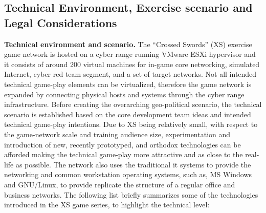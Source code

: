 \subsection{Technical Environment, Exercise scenario and Legal Considerations}
\label{sec:scenario}
\textbf{Technical environment and scenario.}
The ``Crossed Swords'' (XS) exercise game network is hosted on a cyber range running VMware ESXi hypervisor and it consists of around 200 virtual machines for in-game core networking, simulated Internet, cyber red team segment, and a set of target networks. Not all intended technical game-play elements can be virtualized, therefore the game network is expanded by connecting physical hosts and systems through the cyber range infrastructure. Before creating the overarching geo-political scenario, the technical scenario is established based on the core development team ideas and intended technical game-play intentions.
Due to XS being relatively small, with respect to the game-network scale and training audience size, experimentation and introduction of new, recently prototyped, and orthodox technologies can be afforded making the technical game-play more attractive and as close to the real-life as possible. The network also uses the traditional \gls{it} systems to provide the networking and common workstation operating systems, such as, MS Windows and GNU/Linux, to provide replicate the structure of a regular office and business networks.
The following list briefly summarizes some of the technologies introduced in the XS game series, to highlight the technical level:
